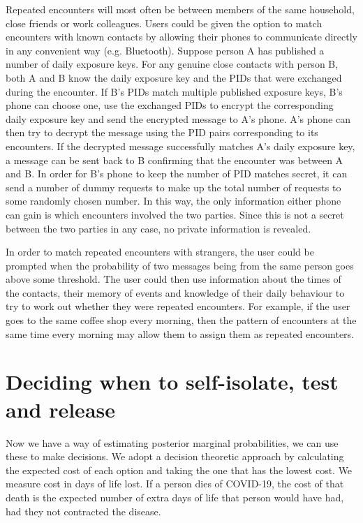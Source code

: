 \documentclass{article}
\begin{document}
Repeated encounters will most often be between members of the same household, close friends or work colleagues. Users could be given the option to match encounters with known contacts by allowing their phones to communicate directly in any convenient way (e.g. Bluetooth). Suppose person A has published a number of daily exposure keys. For any genuine close contacts with person B, both A and B know the daily exposure key and the PIDs that were exchanged during the encounter. If B's PIDs match multiple published exposure keys, B's phone can choose one, use the exchanged PIDs to encrypt the corresponding daily exposure key and send the encrypted message to A's phone. A's phone can then try to decrypt the message using the PID pairs corresponding to its encounters. If the decrypted message successfully matches A's daily exposure key, a message can be sent back to B confirming that the encounter was between A and B. In order for B's phone to keep the number of PID matches secret, it can send a number of dummy requests to make up the total number of requests to some randomly chosen number. In this way, the only information either phone can gain is which encounters involved the two parties. Since this is not a secret between the two parties in any case, no private information is revealed.

In order to match repeated encounters with strangers, the user could be prompted when the probability of two messages being from the same person goes above some threshold. The user could then use information about the times of the contacts, their memory of events and knowledge of their daily behaviour to try to work out whether they were repeated encounters. For example, if the user goes to the same coffee shop every morning, then the pattern of encounters at the same time every morning may allow them to assign them as repeated encounters.


\section{Deciding when to self-isolate, test and release}
Now we have a way of estimating posterior marginal probabilities, we can use these to make decisions. We adopt a decision theoretic approach by calculating the expected cost of each option and taking the one that has the lowest cost. We measure cost in days of life lost. If a person dies of COVID-19, the cost of that death is the expected number of extra days of life that person would have had, had they not contracted the disease.
\end{document}
